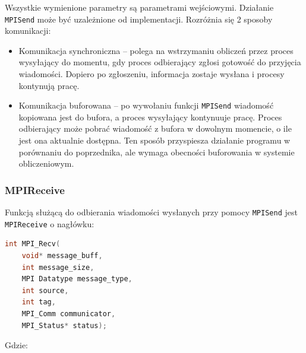 Wszystkie wymienione parametry są parametrami wejściowymi. Działanie \texttt{MPI\textunderscore Send} może być uzależnione od implementacji. Rozróżnia się 2 sposoby komunikacji:

\begin{itemize}
	\item Komunikacja synchroniczna -- polega na wstrzymaniu obliczeń przez proces wysyłający do momentu, gdy proces odbierający zgłosi gotowość do przyjęcia wiadomości. Dopiero po zgłoszeniu, informacja zostaje wysłana i procesy kontynują pracę.
	\item Komunikacja buforowana -- po wywołaniu funkcji \texttt{MPI\textunderscore Send} wiadomość kopiowana jest do bufora, a proces wysyłający kontynuuje pracę. Proces odbierający może pobrać wiadomość z bufora w dowolnym momencie, o ile jest ona aktualnie dostępna. Ten sposób przyspiesza działanie programu w porównaniu do poprzednika, ale wymaga obecności buforowania w systemie obliczeniowym.
\end{itemize}

\subsubsection{MPI\textunderscore Receive}
Funkcją służącą do odbierania wiadomości wysłanych przy pomocy \texttt{MPI\textunderscore Send} jest \texttt{MPI\textunderscore Receive} o nagłówku:
\begin{lstlisting}[language=C]
int MPI_Recv(
	void* message_buff,
	int message_size,
	MPI Datatype message_type,
	int source,
	int tag,
	MPI_Comm communicator,
	MPI_Status* status);
\end{lstlisting}

Gdzie:

